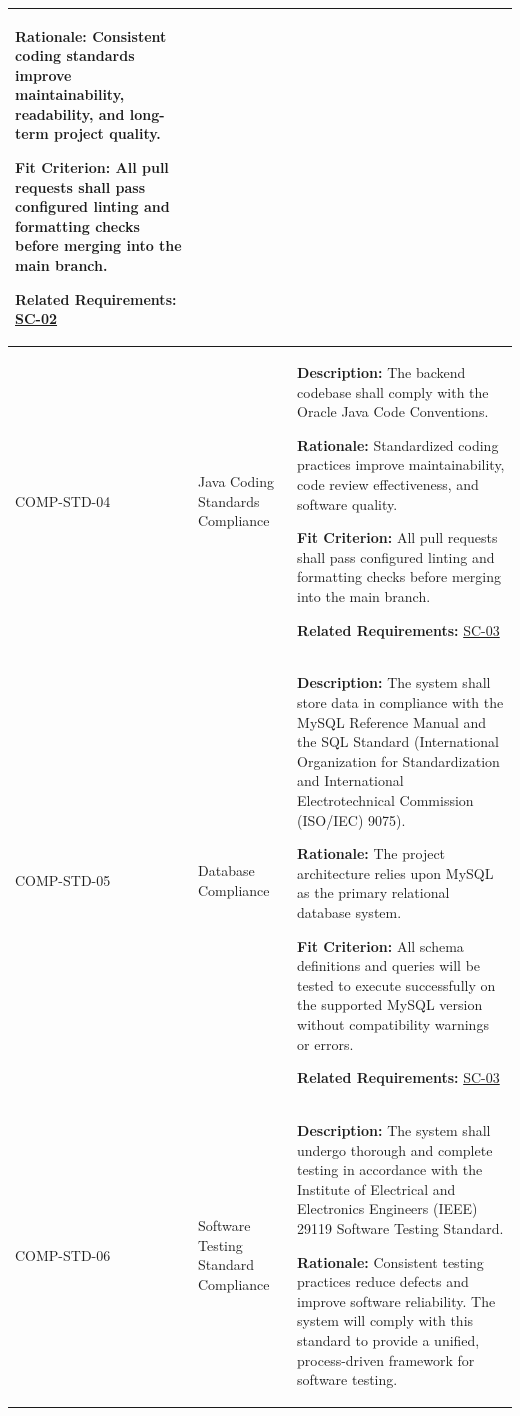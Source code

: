 \documentclass[12pt]{article}
\newcommand{\acr}[3]{\phantomsection\label{acr:#1}#2 (#3)}
\begin{document}
\begin{xltabular}{\textwidth}{|p{2.6cm}|p{3.4cm}|X|}
\textbf{Rationale:} Consistent coding standards improve maintainability, readability, and long-term project quality. 

\textbf{Fit Criterion:} All pull requests shall pass configured linting and formatting checks before merging into the main branch.

\textbf{Related Requirements:} \hyperlink{req:SC-02}{SC-02}\\
\hline

COMP-STD-04\hypertarget{req:COMP-STD-04}{} & 
Java Coding Standards Compliance & 
\textbf{Description:} The backend codebase shall comply with the Oracle Java Code Conventions. 

\textbf{Rationale:} Standardized coding practices improve maintainability, code review effectiveness, and software quality. 

\textbf{Fit Criterion:} All pull requests shall pass configured linting and formatting checks before merging into the main branch.

\textbf{Related Requirements:} \hyperlink{req:SC-03}{SC-03}\\
\hline

COMP-STD-05\hypertarget{req:COMP-STD-05}{} & 
Database Compliance & 
\textbf{Description:} The system shall store data in compliance with the MySQL Reference Manual and the SQL Standard (\acr{ISOIEC}{International Organization for Standardization and International Electrotechnical Commission}{ISO/IEC} 9075). 

\textbf{Rationale:} The project architecture relies upon MySQL as the primary relational database system. 

\textbf{Fit Criterion:} All schema definitions and queries will be tested to execute successfully on the supported MySQL version without compatibility warnings or errors.

\textbf{Related Requirements:} \hyperlink{req:SC-03}{SC-03}\\
\hline

COMP-STD-06\hypertarget{req:COMP-STD-06}{} & 
Software Testing Standard Compliance & 
\textbf{Description:} The system shall undergo thorough and complete testing in accordance with the \acr{IEEE}{Institute of Electrical and Electronics Engineers}{IEEE} 29119 Software Testing Standard. 

\textbf{Rationale:} Consistent testing practices reduce defects and improve software reliability. The system will comply with this standard to provide a unified, process-driven framework for software testing.


\end{xltabular}
\end{document}

